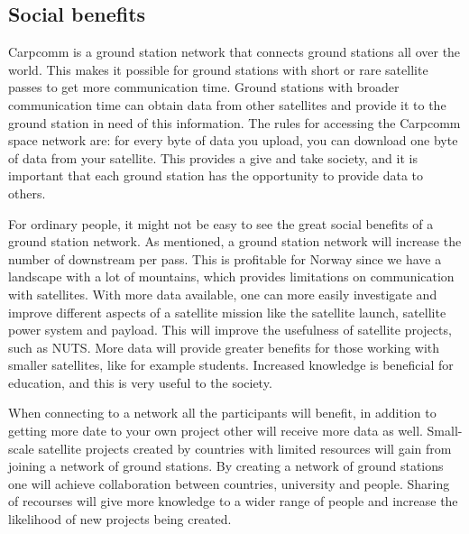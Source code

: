 \subsection{Social benefits}


Carpcomm is a ground station network that connects ground stations all over the world. This makes it possible for ground stations with short or rare satellite passes to get more communication time. Ground stations with broader communication time can obtain data from other satellites and provide it to the ground station in need of this information. The rules for accessing the Carpcomm space network are: for every byte of data you upload, you can download one byte of data from your satellite. This provides a give and take society, and it is important that each ground station has the opportunity to provide data to others. 

For ordinary people, it might not be easy to see the great social benefits of a ground station network. As mentioned, a ground station network will increase the number of downstream per pass. This is profitable for Norway since we have a landscape with a lot of mountains, which provides limitations on communication with satellites. With more data available, one can more easily investigate and improve different aspects of a satellite mission like the satellite launch, satellite power system and payload. This will improve the usefulness of satellite projects, such as NUTS. More data will provide greater benefits for those working with smaller satellites, like for example students. Increased knowledge is beneficial for education, and this is very useful to the society. 

When connecting to a network all the participants will benefit, in addition to getting more date to your own project other will receive more data as well. Small-scale satellite projects created by countries with limited resources will gain from joining a network of ground stations. By creating a network of ground stations one will achieve collaboration between countries, university and people. 
Sharing of recourses will give more knowledge to a wider range of people and increase the likelihood of new projects being created. 


